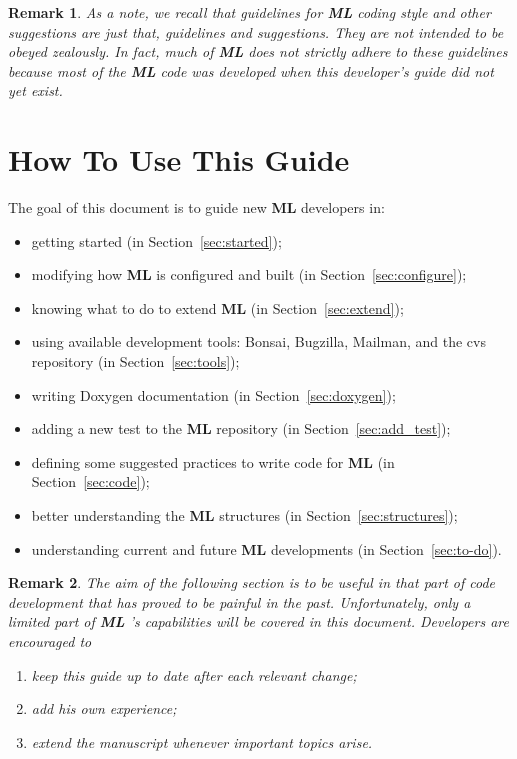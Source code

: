 \documentclass[10pt,letter,relax]{SANDreport}
\newtheorem{remark}{Remark}
\newcommand{\ML}     {{\bf ML }}
\begin{document}
\begin{remark}
  As a note, we recall that guidelines for \ML coding style and other
  suggestions are just that, guidelines and
  suggestions. They are not intended to be obeyed zealously.
  In fact, much of \ML does not strictly adhere to these guidelines because
  most of the \ML code was developed when this developer's
  guide did not yet exist.
  
\end{remark}


\section{How To Use This Guide}
\label{sec:how}

The goal of this document is to guide new \ML developers in:
\begin{itemize}
\item getting started (in Section~\ref{sec:started});
\item modifying how \ML is configured and built (in Section~\ref{sec:configure});
\item knowing what to do to extend \ML (in Section~\ref{sec:extend});
\item using available development tools: Bonsai, Bugzilla, Mailman, and the
cvs repository 
  (in Section~\ref{sec:tools});
\item writing Doxygen documentation (in Section~\ref{sec:doxygen});
\item adding a new test to the \ML repository (in Section~\ref{sec:add_test});
\item defining some suggested practices to write code for \ML (in Section~\ref{sec:code});
\item better understanding the \ML structures (in Section~\ref{sec:structures});
\item understanding current and future \ML developments (in
  Section~\ref{sec:to-do}).
\end{itemize}

\begin{remark}
  The aim of the following section is to be useful in that part of code
  development that has proved to be painful in the past. Unfortunately,
  only a limited part of \ML's capabilities will be covered in this
  document.
  Developers are encouraged to
  \begin{enumerate}
    \item keep this guide up to date after each relevant change;
    \item add his own experience;
    \item extend the manuscript whenever important topics arise.
  \end{enumerate}
\end{remark}
\end{document}
